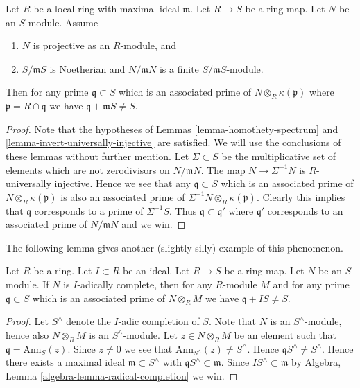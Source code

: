 \begin{lemma}
\label{lemma-explain-why-pure}
Let $R$ be a local ring with maximal ideal $\mathfrak m$.
Let $R \to S$ be a ring map. Let $N$ be an $S$-module.
Assume
\begin{enumerate}
\item $N$ is projective as an $R$-module, and
\item $S/\mathfrak mS$ is Noetherian and $N/\mathfrak mN$ is a finite
$S/\mathfrak mS$-module.
\end{enumerate}
Then for any prime $\mathfrak q \subset S$ which is an associated prime of
$N \otimes_R \kappa(\mathfrak p)$ where $\mathfrak p = R \cap \mathfrak q$
we have $\mathfrak q + \mathfrak m S \not = S$.
\end{lemma}

\begin{proof}
Note that the hypotheses of
Lemmas \ref{lemma-homothety-spectrum} and
\ref{lemma-invert-universally-injective}
are satisfied. We will use the conclusions of these lemmas without further
mention. Let $\Sigma \subset S$ be the multiplicative set of elements
which are not zerodivisors on $N/\mathfrak mN$. The map
$N \to \Sigma^{-1}N$ is $R$-universally injective. Hence we see that
any $\mathfrak q \subset S$ which is an associated prime of
$N \otimes_R \kappa(\mathfrak p)$ is also an associated prime of
$\Sigma^{-1}N \otimes_R \kappa(\mathfrak p)$. Clearly this implies that
$\mathfrak q$ corresponds to a prime of $\Sigma^{-1}S$.
Thus $\mathfrak q \subset \mathfrak q'$ where $\mathfrak q'$
corresponds to an associated prime of $N/\mathfrak mN$ and we win.
\end{proof}

\noindent
The following lemma gives another (slightly silly) example of this phenomenon.

\begin{lemma}
\label{lemma-explain-why-pure-complete}
Let $R$ be a ring. Let $I \subset R$ be an ideal.
Let $R \to S$ be a ring map. Let $N$ be an $S$-module.
If $N$ is $I$-adically complete, then for any $R$-module $M$ and
for any prime $\mathfrak q \subset S$ which is an associated prime of
$N \otimes_R M$ we have $\mathfrak q + I S \not = S$.
\end{lemma}

\begin{proof}
Let $S^\wedge$ denote the $I$-adic completion of $S$.
Note that $N$ is an $S^\wedge$-module, hence also
$N \otimes_R M$ is an $S^\wedge$-module.
Let $z \in N \otimes_R M$ be an element such that
$\mathfrak q = \text{Ann}_S(z)$. Since $z \not = 0$ we see
that $\text{Ann}_{S^\wedge}(z) \not = S^\wedge$. Hence
$\mathfrak q S^\wedge \not = S^\wedge$. Hence there exists a
maximal ideal $\mathfrak m \subset S^\wedge$ with
$\mathfrak q S^\wedge \subset \mathfrak m$. Since
$IS^\wedge \subset \mathfrak m$ by
Algebra, Lemma \ref{algebra-lemma-radical-completion}
we win.
\end{proof}

